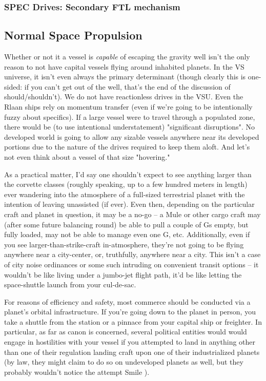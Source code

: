 \subsubsection{SPEC Drives: Secondary FTL mechanism}

\subsection{Normal Space Propulsion}

Whether or not it a vessel is {\em capable} of escaping the gravity well
isn't the only reason to not have capital vessels flying around
inhabited planets. In the VS universe, it isn't even always the
primary determinant (though clearly this is one-sided: if you can't
get out of the well, that's the end of the discussion of
should/shouldn't). We do not have reactionless drives in the VSU. Even
the Rlaan ships rely on momentum transfer (even if we're going to be
intentionally fuzzy about specifics). If a large vessel were to travel
through a populated zone, there would be (to use intentional
understatement) "significant disruptions". No developed world is going
to allow any sizable vessels anywhere near its developed portions due
to the nature of the drives required to keep them aloft. And let's not
even think about a vessel of that size "hovering."

As a practical matter, I'd say one shouldn't expect to see anything
larger than the corvette classes (roughly speaking, up to a few
hundred meters in length) ever wandering into the atmosphere of a
full-sized terrestrial planet with the intention of leaving unassisted
(if ever). Even then, depending on the particular craft and planet in
question, it may be a no-go -- a Mule or other cargo craft may (after
some future balancing round) be able to pull a couple of Gs empty, but
fully loaded, may not be able to manage even one G, etc. Additionally,
even if you see larger-than-strike-craft in-atmosphere, they're not
going to be flying anywhere near a city-center, or, truthfully,
anywhere near a city. This isn't a case of city noise ordinances or
some such intruding on convenient transit options -- it wouldn't be
like living under a jumbo-jet flight path, it'd be like letting the
space-shuttle launch from your cul-de-sac.

For reasons of efficiency and safety, most commerce should be
conducted via a planet's orbital infrastructure. If you're going down
to the planet in person, you take a shuttle from the station or a
pinnace from your capital ship or freighter. In particular, as far as
canon is concerned, several political entities would would engage in
hostilities with your vessel if you attempted to land in anything
other than one of their regulation landing craft upon one of their
industrialized planets (by law, they might claim to do so on
undeveloped planets as well, but they probably wouldn't notice the
attempt Smile ).

